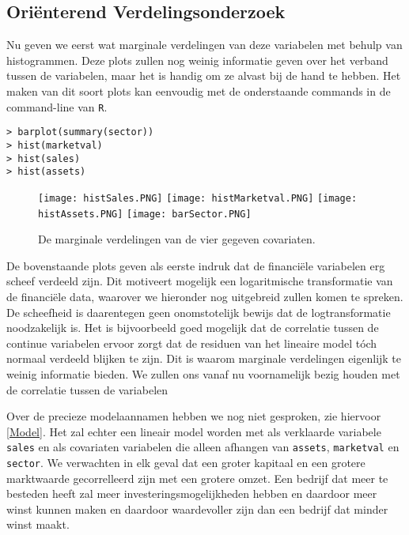 \documentclass[a4paper]{report}
\begin{document}
\subsection{Ori\"enterend Verdelingsonderzoek}
\label{Verdelingsonderzoek}
  Nu geven we eerst wat marginale verdelingen van deze variabelen met behulp van histogrammen. Deze plots zullen nog weinig informatie geven over het verband tussen de variabelen, maar het is handig om ze alvast bij de hand te hebben. Het maken van dit soort plots kan eenvoudig met de onderstaande commands in de command-line van \verb!R!.
  
  \begin{verbatim}
> barplot(summary(sector))
> hist(marketval)
> hist(sales)
> hist(assets)
  \end{verbatim}


  \begin{figure}[H]
  \label{covariaten marginaal}
  \begin{center}
  \texttt{[image: histSales.PNG]}
  \texttt{[image: histMarketval.PNG]}
  \texttt{[image: histAssets.PNG]}
  \texttt{[image: barSector.PNG]}
  \end{center}
  \caption{De marginale verdelingen van de vier gegeven covariaten.}
  \end{figure}
  
  De bovenstaande plots geven als eerste indruk dat de financi\"ele variabelen erg scheef verdeeld zijn. Dit motiveert mogelijk een logaritmische transformatie van de financi\"ele data, waarover we hieronder nog uitgebreid zullen komen te spreken. De scheefheid is daarentegen geen onomstotelijk bewijs dat de logtransformatie noodzakelijk is. Het is bijvoorbeeld goed mogelijk dat de correlatie tussen de continue variabelen ervoor zorgt dat de residuen van het lineaire model t\' och normaal verdeeld blijken te zijn. Dit is waarom marginale verdelingen eigenlijk te weinig informatie bieden. We zullen ons vanaf nu voornamelijk bezig houden met de correlatie tussen de variabelen
  
  Over de precieze modelaannamen hebben we nog niet gesproken, zie hiervoor \ref{Model}. Het zal echter een lineair model worden met als verklaarde variabele \verb!sales! en als covariaten variabelen die alleen afhangen van \verb!assets!, \verb!marketval! en \verb!sector!. We verwachten in elk geval dat een groter kapitaal en een grotere marktwaarde gecorrelleerd zijn met een grotere omzet. Een bedrijf dat meer te besteden heeft zal meer investeringsmogelijkheden hebben en daardoor meer winst kunnen maken en daardoor waardevoller zijn dan een bedrijf dat minder winst maakt. 
  
\end{document}
